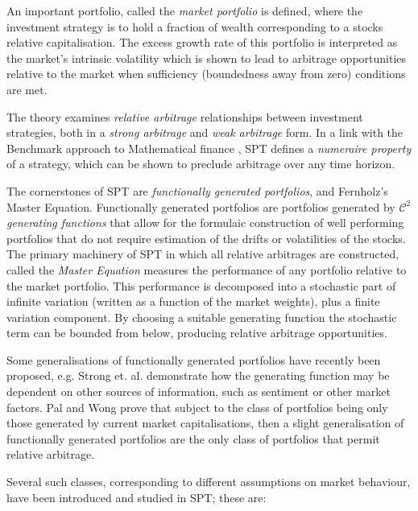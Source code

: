 \documentclass[british]{amsart} \usepackage{lmodern}
\numberwithin{equation}{section} \numberwithin{figure}{section}
\theoremstyle{plain} \newtheorem{thm}{\protect\theoremname}[section]
\theoremstyle{definition} \newtheorem{defn}[thm]{\protect\definitionname}
\theoremstyle{plain} \newtheorem{assumption}[thm]{\protect\assumptionname}
\theoremstyle{plain} \newtheorem{lem}[thm]{\protect\lemmaname}
\theoremstyle{plain} \newtheorem{prop}[thm]{\protect\propositionname}
\theoremstyle{remark} \newtheorem{rem}[thm]{\protect\remarkname}
\theoremstyle{plain} \newtheorem{cor}[thm]{\protect\corollaryname}
\begin{document}
An important portfolio, called the \textit{market portfolio} is defined, where
the investment strategy is to hold a fraction of wealth corresponding to a
stocks relative capitalisation. The excess growth rate of this portfolio is
interpreted as the market's intrinsic volatility which is shown to lead to
arbitrage opportunities relative to the market when sufficiency (boundedness
away from zero) conditions are met.

The theory examines \textit{relative arbitrage} relationships between investment
strategies, both in a \textit{strong arbitrage} and \textit{weak arbitrage}
form. In a link with the Benchmark approach to Mathematical finance
\cite{platen2006}, SPT defines a \textit{numeraire property} of a strategy,
which can be shown to preclude arbitrage over any time horizon.

The cornerstones of SPT are \textit{functionally generated portfolios}, and
Fernholz's Master Equation. Functionally generated portfolios are
portfolios generated by $\mathcal{C}^2$ \textit{generating functions} that allow
for the formulaic construction of well performing portfolios that
do not require estimation of the drifts or volatilities of the stocks. The
primary machinery of SPT in which all relative arbitrages are
constructed, called the \textit{Master Equation} measures the performance of any
portfolio relative to the market portfolio. This performance is decomposed into
a stochastic part of infinite variation (written as a function of the market
weights), plus a finite variation component. By choosing a suitable generating
function the stochastic term can be bounded from below, producing relative
arbitrage opportunities.

Some generalisations of functionally generated portfolios have recently been
proposed, e.g. Strong et. al. \cite{strong2014generalizations} demonstrate
how the generating function may be dependent on other sources of information,
such as sentiment or other market factors. Pal and Wong \cite{pal2013} prove
that subject to the class of portfolios being only those generated by current
market capitalisations, then a slight generalisation of functionally generated
portfolios are the only class of portfolios that permit relative arbitrage.

Several such classes, corresponding to different assumptions on market
behaviour, have been introduced and studied in SPT; these are:
\end{document}
